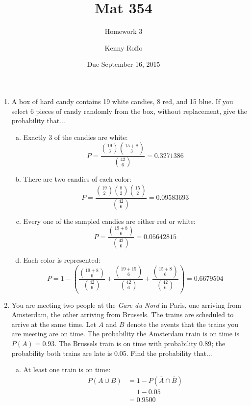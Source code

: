 \documentclass{scrartcl}
\title{Mat 354}
\subtitle{Homework 3}
\author{Kenny Roffo}
\date{Due September 16, 2015}
\begin{document}
\maketitle
\begin{enumerate}
\item A box of hard candy contains 19 white candies, 8 red, and 15 blue. If you select 6 pieces of candy randomly from the box, without replacement, give the probability that...

\begin{enumerate}[a)]

\item Exactly 3 of the candies are white:\\
$$ P = \frac{{19 \choose 3}{15 + 8 \choose 3}}{{42 \choose 6}} = 0.3271386$$

\item There are two candies of each color:\\
$$ P = \frac{{19 \choose 2}{8 \choose 2}{15 \choose 2}}{{42 \choose 6}} = 0.09583693$$

\item Every one of the sampled candies are either red or white:\\
$$ P = \frac{{19 + 8 \choose 6}}{{42 \choose 6}} = 0.05642815$$

\item Each color is represented:\\
$$ P = 1 - \left(\frac{{19 + 8 \choose 6}}{{42 \choose 6}} + \frac{{19 + 15 \choose 6}}{{42 \choose 6}} + \frac{{15 + 8 \choose 6}}{{42 \choose 6}}\right) = 0.6679504$$

\end{enumerate}
\pagebreak

\item You are meeting two people at the \emph{Gare du Nord} in Paris, one arriving from Amsterdam, the other arriving from Brussels. The trains are scheduled to arrive at the same time. Let $A$ and $B$ denote the events that the trains you are meeting are on time. The probability the Amsterdam train is on time is $P(A) = 0.93$. The Brussels train is on time with probability 0.89; the probability both trains are late is 0.05. Find the probability that...

\begin{enumerate}[a)]

\item At least one train is on time:\\
\begin{align*}
P(A \cup B) &= 1 - P(\bar{A}\cap\bar{B})\\
            &= 1 - 0.05\\
            &= 0.9500
\end{align*}


\end{enumerate}
\end{enumerate}
\end{document}

